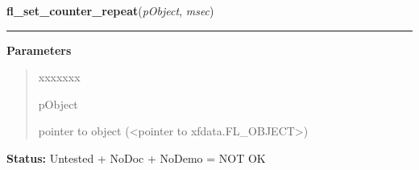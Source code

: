 \hspace{.8\funcindent}\begin{boxedminipage}{\funcwidth}

    \raggedright \textbf{fl\_set\_counter\_repeat}(\textit{pObject}, \textit{msec})

    \vspace{-1.5ex}

    \rule{\textwidth}{0.5\fboxrule}
\setlength{\parskip}{2ex}
\setlength{\parskip}{1ex}
      \textbf{Parameters}
      \vspace{-1ex}

      \begin{quote}
        \begin{Ventry}{xxxxxxx}

          \item[pObject]

          pointer to object ({\textless}pointer to 
          xfdata.FL\_OBJECT{\textgreater})

        \end{Ventry}

      \end{quote}

\textbf{Status:} Untested + NoDoc + NoDemo = NOT OK



    \end{boxedminipage}

    \label{xformslib:library:fl_get_counter_min_repeat}

    \vspace{0.5ex}

